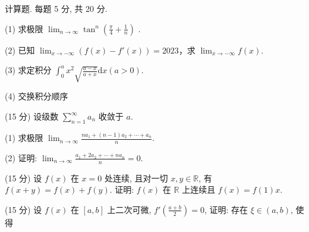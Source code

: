 \par{}
计算题. 每题 5 分, 共 20 分.\par
(1) 求极限  $\lim_{n\to\infty}\tan^{n}\left(\frac{\pi}{4}+\frac{1}{n}\right)$ .\par
(2) 已知 $\lim_{x\to -\infty}(f(x) - f'(x)) = 2023$，求 $\lim_{x\to -\infty}f(x)$.\par
(3) 求定积分 $\int_0^a x^2\sqrt{\frac{a - x}{a + x}}\mathrm{d}x (a > 0)$.\par
(4) 交换积分顺序 \par
\par{}
(15 分) 设级数 $\sum_{n=1}^{\infty} a_n$ 收敛于 $a$.\par
(1) 求极限  $\lim_{n\to\infty}\frac{na_{1}+(n-1)a_{2}+\cdots+a_{n}}{n}.$\par
(2) 证明: $\lim_{n\to \infty}\frac{a_1 + 2a_2 + \cdots + na_n}{n} = 0.$\par
\par{}
(15 分) 设 $f(x)$ 在 $x = 0$ 处连续, 且对一切 $x, y \in \mathbb{R}$, 有 $f(x + y) = f(x) + f(y)$. 证明: $f(x)$ 在 $\mathbb{R}$ 上连续且 $f(x) = f(1)x$.\par
\par{}
\par{}
(15 分) 设 $f(x)$ 在 $[a, b]$ 上二次可微, $f' \left( \frac{a + b}{2} \right) = 0$, 证明: 存在 $\xi \in (a, b)$, 使得\par
\nopagebreak[4]
